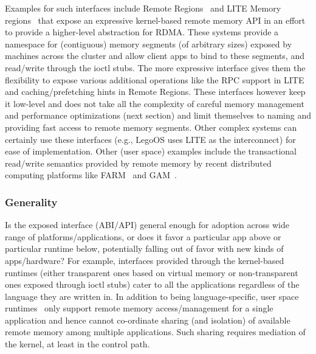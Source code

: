 Examples for such interfaces include Remote Regions~\cite{remregions} 
and LITE Memory regions~\cite{literdma} that expose an expressive
kernel-based remote memory API in an effort to provide a 
higher-level abstraction for RDMA.
These systems provide a namespace for (contiguous) memory 
segments (of arbitrary sizes) exposed by machines across the 
cluster and allow client apps to bind to these segments, 
and read/write through the ioctl stubs. The more expressive 
interface gives them the flexibility to expose various 
additional operations like the RPC support in LITE and 
caching/prefetching hints in Remote Regions. 
These interfaces however keep it low-level and does not take 
all the complexity of careful memory management and performance 
optimizations (next section) and limit themselves to naming 
and providing fast access to remote memory segments. Other 
complex systems can certainly use these interfaces 
(e.g., LegoOS uses LITE as the interconnect) for ease of 
implementation. Other (user space) examples include the 
transactional read/write semantics provided by
remote memory by recent distributed computing platforms like
FARM~\cite{farm} and GAM~\cite{gam}.



\subsubsection{Generality} 
Is the exposed interface (ABI/API) 
general enough for adoption across wide range of 
platforms/applications, or does it favor a particular app 
above or particular runtime below, potentially falling out 
of favor with new kinds of apps/hardware? For example,
interfaces provided through the kernel-based runtimes 
(either transparent ones based on virtual memory or 
non-transparent ones exposed through ioctl stubs) cater to  
all the applications regardless of the language they are 
written in. In addition to being language-specific, user space 
runtimes~\cite{aifm,semeru} only support remote memory 
access/management for a single application and hence cannot 
co-ordinate sharing (and isolation) of available remote 
memory among multiple applications. Such sharing requires 
mediation of the kernel, at least in the control path.


